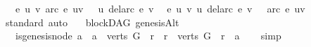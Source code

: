 \begin{isabellebody}
\ \ {\isachardoublequoteopen}{\isacharparenleft}{\kern0pt}{\isasymforall}e\ u\ v{\isachardot}{\kern0pt}\ arc\ e\ {\isacharparenleft}{\kern0pt}u{\isacharcomma}{\kern0pt}v{\isacharparenright}{\kern0pt}\ {\isasymlongrightarrow}\ {\isasymnot}\ {\isacharparenleft}{\kern0pt}u\ {\isasymrightarrow}\isactrlsup {\isacharplus}{\kern0pt}\isactrlbsub {\isacharparenleft}{\kern0pt}del{\isacharunderscore}{\kern0pt}arc\ e{\isacharparenright}{\kern0pt}\isactrlesub \ v{\isacharparenright}{\kern0pt}{\isacharparenright}{\kern0pt}\ \isanewline
{\isasymlongleftrightarrow}\ {\isacharparenleft}{\kern0pt}{\isasymforall}e\ u\ v{\isachardot}{\kern0pt}\ {\isacharparenleft}{\kern0pt}u\ {\isasymrightarrow}\isactrlsup {\isacharplus}{\kern0pt}\isactrlbsub {\isacharparenleft}{\kern0pt}del{\isacharunderscore}{\kern0pt}arc\ e{\isacharparenright}{\kern0pt}\isactrlesub \ v{\isacharparenright}{\kern0pt}\ {\isasymlongrightarrow}\ {\isasymnot}\ arc\ e\ {\isacharparenleft}{\kern0pt}u{\isacharcomma}{\kern0pt}v{\isacharparenright}{\kern0pt}{\isacharparenright}{\kern0pt}{\isachardoublequoteclose}\ \isanewline
%
\isadelimproof
%
\endisadelimproof
%
\isatagproof
{}\isamarkupfalse%
{\isacharparenleft}{\kern0pt}standard{\isacharcomma}{\kern0pt}\ auto{\isacharparenright}{\kern0pt}\ \isamarkupfalse%
%
\endisatagproof
{\isafoldproof}%
%
\isadelimproof
%
\endisadelimproof
%
\isadelimdocument
%
\endisadelimdocument
%
\isatagdocument
%
\isamarkuptrue%
%
\endisatagdocument
{\isafolddocument}%
%
\isadelimdocument
%
\endisadelimdocument
{}\isamarkupfalse%
\ {\isacharparenleft}{\kern0pt}\ blockDAG{\isacharparenright}{\kern0pt}\ genesisAlt\ {\isacharcolon}{\kern0pt}\isanewline
\ \ {\isachardoublequoteopen}{\isacharparenleft}{\kern0pt}is{\isacharunderscore}{\kern0pt}genesis{\isacharunderscore}{\kern0pt}node\ a{\isacharparenright}{\kern0pt}\ {\isasymlongleftrightarrow}\ {\isacharparenleft}{\kern0pt}{\isacharparenleft}{\kern0pt}a\ {\isasymin}\ verts\ G{\isacharparenright}{\kern0pt}\ {\isasymand}\ {\isacharparenleft}{\kern0pt}{\isasymforall}r{\isachardot}{\kern0pt}\ \ {\isacharparenleft}{\kern0pt}r\ {\isasymin}\ verts\ G{\isacharparenright}{\kern0pt}\ {\isasymlongrightarrow}\ r\ {\isasymrightarrow}\isactrlsup {\isacharasterisk}{\kern0pt}\ a{\isacharparenright}{\kern0pt}{\isacharparenright}{\kern0pt}{\isachardoublequoteclose}\isanewline
%
\isadelimproof
\ \ %
\endisadelimproof
%
\isatagproof
{}\isamarkupfalse%
\ simp%
\endisatagproof
{\isafoldproof}%
%
\isadelimproof
\isanewline
%
\endisadelimproof
\isanewline

\end{isabellebody}

